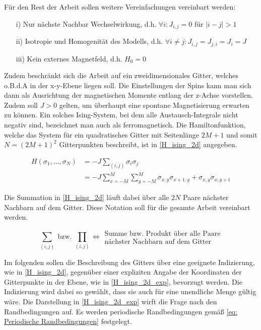 \noindent Für den Rest der Arbeit sollen weitere Vereinfachungen vereinbart werden:
\begin{itemize}
\item[i)] Nur nächste Nachbar Wechselwirkung, d.h. $\forall i : J_{i,j} = 0$ für $\vert i-j \vert > 1$
\item[ii)] Isotropie und Homogenität des Modells, d.h. $ \forall i\neq j : J_{i,j} = J_{j,i} = J_i = J $
\item[iii)] Kein externes Magnetfeld, d.h. $H_0 = 0$
\end{itemize}

\noindent Zudem beschränkt sich die Arbeit auf ein zweidimensionales Gitter, welches o.B.d.A in der x-y-Ebene liegen soll. Die Einstellungen der Spins kann man sich dann als Ausrichtung der magnetischen Momente entlang der z-Achse vorstellen. Zudem soll $J > 0$ gelten, um überhaupt eine spontane Magnetisierung erwarten zu können. Ein solches Ising-System, bei dem alle Austausch-Integrale nicht negativ sind, bezeichnet man auch als ferromagnetisch. Die Hamiltonfunktion, welche das System für ein quadratisches Gitter mit Seitenlänge $2M+1$ und somit $N = (2M+1)^2$ Gitterpunkten beschreibt, ist in \eqref{H_ising_2d} angegeben.

\begin{grayframe}[frametitle = {2d Ising-Modell ohne externes Magnetfeld}]
\begin{align} 
H(\sigma_1, \dots, \sigma_N) &= - J  \sum_{(i,j)} \sigma_i \sigma_j \label{H_ising_2d}\\
  &= - J \sum_{x = -M}^M \sum_{y = -M}^M \sigma_{x, y} \sigma_{x+1, y} + \sigma_{x, y} \sigma_{x,y+1} \label{H_ising_2d_exp} 
\end{align}
\end{grayframe}

\noindent Die Summation in \eqref{H_ising_2d} läuft dabei über alle $2N$ Paare nächster Nachbarn auf dem Gitter. Diese Notation soll für die gesamte Arbeit vereinbart werden.

\begin{equation}
\sum_{(i,j)} \;\text{bzw.}\; \prod_{(i,j)} \iff  \begin{array}{ll} \text{Summe bzw. Produkt über alle Paare} \\ \text{nächster Nachbarn auf dem Gitter} \end{array}
\end{equation}

\noindent Im folgenden sollen die Beschreibung des Gitters über eine geeignete Indizierung, wie in \eqref{H_ising_2d}, gegenüber einer expliziten Angabe der Koordinaten der Gitterpunkte in der Ebene, wie in \eqref{H_ising_2d_exp}, bevorzugt werden. Die Indizierung wird dabei so gewählt, dass sie auch für eine unendliche Menge gültig wäre. Die Darstellung in \eqref{H_ising_2d_exp} wirft die Frage nach den Randbedingungen auf. Es werden periodische Randbedingungen gemäß \eqref{eq: Periodische Randbedingungen} festgelegt. 


